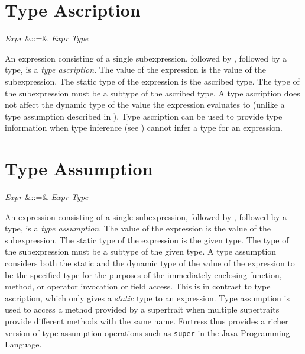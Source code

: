 %
%
%
%

\section{Type Ascription}

\begin{Grammar}
\emph{Expr} &::=& \emph{Expr}  \emph{Type}
\end{Grammar}

An expression consisting of a single subexpression, followed by
, followed by a type, is a \emph{type ascription}.  The value
of the expression is the value of the subexpression.  The static type
of the expression is the ascribed type.
The type of the subexpression must be a subtype of the ascribed type.
A type ascription does not affect the dynamic type of the value the
expression evaluates to
(unlike a type assumption described in ).
Type ascription can be used to provide
type information when type inference (see )
cannot infer a type for an expression.


\section{Type Assumption}

\begin{Grammar}
\emph{Expr} &::=& \emph{Expr}  \emph{Type}
\end{Grammar}

An expression consisting of a single subexpression, followed by
, followed by a type, is a
\emph{type assumption}.
The value of the expression is the value of the subexpression.
The static type of the expression is the given type.
The type of the subexpression must be a subtype of the given type.
A type assumption considers both the static and the dynamic type of the value
of the expression to be the specified type for the purposes of the
immediately enclosing function, method, or operator invocation or
field access.  This is in contrast to type ascription, which only
gives a \emph{static} type to an expression.  Type assumption is used
to access a method provided by a supertrait when multiple supertraits
provide different methods with the same name.  Fortress thus provides
a richer version of type assumption operations such as \texttt{super}
in the Java Programming Language.
